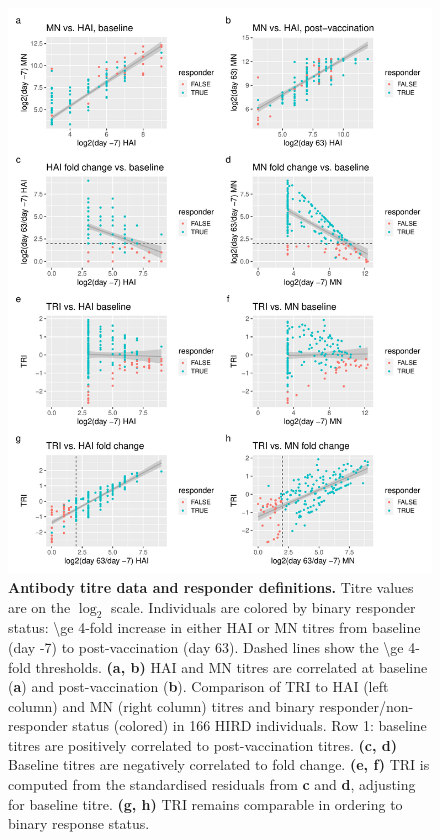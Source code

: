 \begin{figure}
    \includegraphics[width=1.0\textwidth]{mainmatter/figures/chapter_02/phenotype_data_setup.tri_comparison.pdf}
    \caption{
        \textbf{Antibody titre data and responder definitions.}
        Titre values are on the $\log_2$ scale.
        Individuals are colored by binary responder status: \num{\ge 4}-fold increase in either \gls{HAI} or \gls{MN} titres from baseline (day -7) to post-vaccination (day 63).
        Dashed lines show the \num{\ge 4}-fold thresholds.
        \textbf{(a, b)} \gls{HAI} and \gls{MN} titres are correlated at baseline (\textbf{a}) and post-vaccination (\textbf{b}).
        Comparison of \gls{TRI} to \gls{HAI} (left column) and \gls{MN} (right column) titres and binary responder/non-responder status (colored) in 166 \gls{HIRD} individuals. Row 1: baseline titres are positively correlated to post-vaccination titres. 
        \textbf{(c, d)} Baseline titres are negatively correlated to fold change. 
        \textbf{(e, f)} \gls{TRI} is computed from the standardised residuals from \textbf{c} and \textbf{d}, adjusting for baseline titre.
        \textbf{(g, h)} \gls{TRI} remains comparable in ordering to binary response status.
    }
    \label{fig:hird_tri}
\end{figure} 

